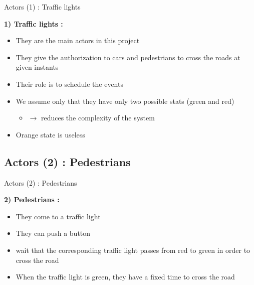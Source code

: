 \documentclass{bredelebeamer}
\begin{document}
\begin{frame}{Actors (1) : Traffic lights }


\textbf{1) Traffic lights : }


\begin{itemize}

\item They are the main actors in this project

\item They give the authorization to cars and pedestrians to cross the roads at given instants

\item Their role is to schedule the events

\item We assume only that they have only two possible stats (green and red)
\begin{itemize}
\item $\longrightarrow$ reduces the complexity of the system
\end{itemize}

\item Orange state is useless

\end{itemize}


\end{frame}


\subsection{Actors (2) : Pedestrians }

\begin{frame}{Actors (2) : Pedestrians }


\textbf{2) Pedestrians : }


\begin{itemize}

\item They come to a traffic light

\item They can push a button

\item wait that the corresponding traffic light passes from red to green in order to cross the road

\item When the traffic light is green, they have a fixed time to cross the road

\end{itemize}


\end{frame}
\end{document}
